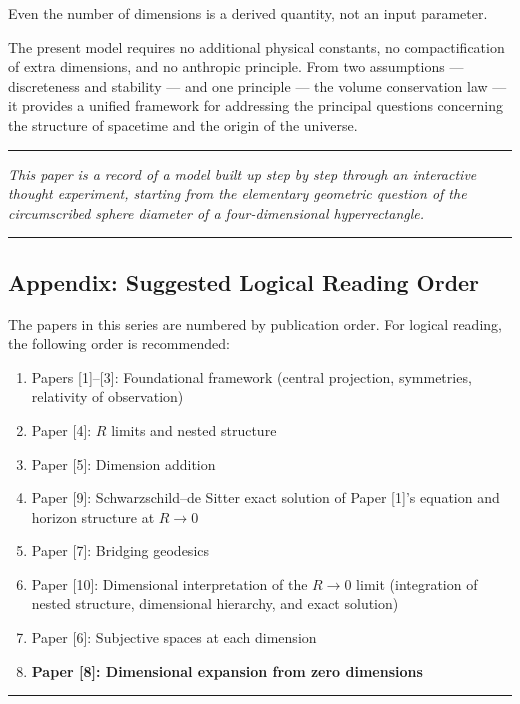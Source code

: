 \documentclass[a4paper,11pt]{article}
\theoremstyle{definition}
\providecommand{\tightlist}{\setlength{\itemsep}{0pt}\setlength{\parskip}{0pt}}
\begin{document}
Even the number of dimensions is a derived quantity, not an input
parameter.

The present model requires no additional physical constants, no
compactification of extra dimensions, and no anthropic principle. From
two assumptions --- discreteness and stability --- and one principle ---
the volume conservation law --- it provides a unified framework for
addressing the principal questions concerning the structure of spacetime
and the origin of the universe.

\begin{center}\rule{0.5\linewidth}{0.5pt}\end{center}

\emph{This paper is a record of a model built up step by step through an
interactive thought experiment, starting from the elementary geometric
question of the circumscribed sphere diameter of a four-dimensional
hyperrectangle.}

\begin{center}\rule{0.5\linewidth}{0.5pt}\end{center}

\subsection{Appendix: Suggested Logical Reading
Order}\label{appendix-suggested-logical-reading-order}

The papers in this series are numbered by publication order. For logical
reading, the following order is recommended:

\begin{enumerate}
\def\labelenumi{\arabic{enumi}.}
\tightlist
\item
  Papers {[}1{]}--{[}3{]}: Foundational framework (central projection,
  symmetries, relativity of observation)
\item
  Paper {[}4{]}: \(R\) limits and nested structure
\item
  Paper {[}5{]}: Dimension addition
\item
  Paper {[}9{]}: Schwarzschild--de Sitter exact solution of Paper
  {[}1{]}'s equation and horizon structure at \(R \to 0\)
\item
  Paper {[}7{]}: Bridging geodesics
\item
  Paper {[}10{]}: Dimensional interpretation of the \(R \to 0\) limit
  (integration of nested structure, dimensional hierarchy, and exact
  solution)
\item
  Paper {[}6{]}: Subjective spaces at each dimension
\item
  \textbf{Paper {[}8{]}: Dimensional expansion from zero dimensions}
\end{enumerate}

\begin{center}\rule{0.5\linewidth}{0.5pt}\end{center}
\end{document}

